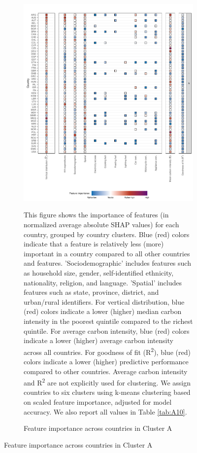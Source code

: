 \documentclass[12pt, a4paper]{article}
\newenvironment{subcaption2}
{\strut
\vspace{-5pt}
\begin{minipage}[b]{0.95\textwidth}
  \hspace*{-\parindent}
  \footnotesize}
 {\end{minipage}}
\begin{document}
\clearpage
\begin{figure}[ht!]
    \centering
    \caption{Feature importance across countries by cluster}\label{fig:fig_4}
    \begin{subfigure}[b]{\textwidth}
    \centering
    \caption{Feature importance across countries in Cluster A}\label{fig:fig_4_1}
    \includegraphics{1_Figures/Figure 4/Figure_4_Corrected_1.pdf}
     \begin{subcaption2}
    This figure shows the importance of features (in normalized average absolute SHAP values) for each country, grouped by country clusters. Blue (red) colors indicate that a feature is relatively less (more) important in a country compared to all other countries and features. 'Sociodemographic' includes features such as household size, gender, self-identified ethnicity, nationality, religion, and language. 'Spatial' includes features such as state, province, district, and urban/rural identifiers. For vertical distribution, blue (red) colors indicate a lower (higher) median carbon intensity in the poorest quintile compared to the richest quintile. For average carbon intensity, blue (red) colors indicate a lower (higher) average carbon intensity across all countries. For goodness of fit (R\textsuperscript{2}), blue (red) colors indicate a lower (higher) predictive performance compared to other countries. Average carbon intensity and R\textsuperscript{2} are not explicitly used for clustering.
    We assign countries to six clusters using k-means clustering based on scaled feature importance, adjusted for model accuracy. We also report all values in Table \ref{tab:A10}.
    \end{subcaption2}
    \end{subfigure}
\end{figure}
\clearpage
\end{document}
